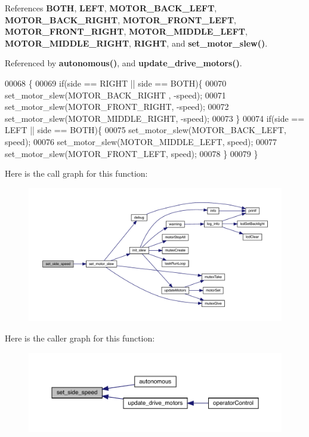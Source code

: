 References \textbf{ B\+O\+TH}, \textbf{ L\+E\+FT}, \textbf{ M\+O\+T\+O\+R\+\_\+\+B\+A\+C\+K\+\_\+\+L\+E\+FT}, \textbf{ M\+O\+T\+O\+R\+\_\+\+B\+A\+C\+K\+\_\+\+R\+I\+G\+HT}, \textbf{ M\+O\+T\+O\+R\+\_\+\+F\+R\+O\+N\+T\+\_\+\+L\+E\+FT}, \textbf{ M\+O\+T\+O\+R\+\_\+\+F\+R\+O\+N\+T\+\_\+\+R\+I\+G\+HT}, \textbf{ M\+O\+T\+O\+R\+\_\+\+M\+I\+D\+D\+L\+E\+\_\+\+L\+E\+FT}, \textbf{ M\+O\+T\+O\+R\+\_\+\+M\+I\+D\+D\+L\+E\+\_\+\+R\+I\+G\+HT}, \textbf{ R\+I\+G\+HT}, and \textbf{ set\+\_\+motor\+\_\+slew()}.



Referenced by \textbf{ autonomous()}, and \textbf{ update\+\_\+drive\+\_\+motors()}.


\begin{DoxyCode}
00068                                            \{
00069   \textcolor{keywordflow}{if}(side == RIGHT || side == BOTH)\{
00070     set_motor_slew(MOTOR_BACK_RIGHT , -speed);
00071     set_motor_slew(MOTOR_FRONT_RIGHT, -speed);
00072     set_motor_slew(MOTOR_MIDDLE_RIGHT, -speed);
00073   \}
00074   \textcolor{keywordflow}{if}(side == LEFT || side == BOTH)\{
00075     set_motor_slew(MOTOR_BACK_LEFT, speed);
00076     set_motor_slew(MOTOR_MIDDLE_LEFT, speed);
00077     set_motor_slew(MOTOR_FRONT_LEFT, speed);
00078   \}
00079 \}
\end{DoxyCode}
Here is the call graph for this function\+:\nopagebreak
\begin{figure}[H]
\begin{center}
\leavevmode
\includegraphics[width=350pt]{drive_8c_a8df41fd50094c065eedc81fc5e6595d1_cgraph}
\end{center}
\end{figure}
Here is the caller graph for this function\+:\nopagebreak
\begin{figure}[H]
\begin{center}
\leavevmode
\includegraphics[width=350pt]{drive_8c_a8df41fd50094c065eedc81fc5e6595d1_icgraph}
\end{center}
\end{figure}
\mbox{\label{drive_8c_a53d6e35d53ec3e0b1b1c489d8203f204}} 

